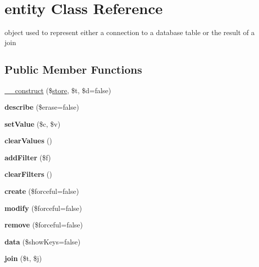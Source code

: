 \hypertarget{classentity}{}\section{entity Class Reference}
\label{classentity}


object used to represent either a connection to a database table or the result of a join  


\subsection*{Public Member Functions}
\begin{DoxyCompactItemize}
\item 
\hyperlink{classentity_a2411a96bf911703bf07e8bac90ffa7f7}{\+\_\+\+\_\+construct} (\$\hyperlink{classstore}{store}, \$t, \$d=false)
\item 
\hypertarget{classentity_a3782e4d51b5f4e688676843e12450a94}{}{\bfseries describe} (\$erase=false)\label{classentity_a3782e4d51b5f4e688676843e12450a94}

\item 
\hypertarget{classentity_a11cae02dda3cc8b9ad4966e33ef11a2a}{}{\bfseries set\+Value} (\$c, \$v)\label{classentity_a11cae02dda3cc8b9ad4966e33ef11a2a}

\item 
\hypertarget{classentity_a7afa5fa5ccc2f9b9a0390cad59ecfede}{}{\bfseries clear\+Values} ()\label{classentity_a7afa5fa5ccc2f9b9a0390cad59ecfede}

\item 
\hypertarget{classentity_a7041812e724f4d4e92f7350ac1ca4730}{}{\bfseries add\+Filter} (\$f)\label{classentity_a7041812e724f4d4e92f7350ac1ca4730}

\item 
\hypertarget{classentity_a3c82e6e7a3a2c79306206db541d2a343}{}{\bfseries clear\+Filters} ()\label{classentity_a3c82e6e7a3a2c79306206db541d2a343}

\item 
\hypertarget{classentity_aa093f16b8fa83dcba92779df20f8a53f}{}{\bfseries create} (\$forceful=false)\label{classentity_aa093f16b8fa83dcba92779df20f8a53f}

\item 
\hypertarget{classentity_a93f973ae16957a93f792003a89a13be0}{}{\bfseries modify} (\$forceful=false)\label{classentity_a93f973ae16957a93f792003a89a13be0}

\item 
\hypertarget{classentity_a67aada7aaf1810524e8ae93992f2900c}{}{\bfseries remove} (\$forceful=false)\label{classentity_a67aada7aaf1810524e8ae93992f2900c}

\item 
\hypertarget{classentity_adfb66dcc511ef54670c2999d9f716eb9}{}{\bfseries data} (\$show\+Keys=false)\label{classentity_adfb66dcc511ef54670c2999d9f716eb9}

\item 
\hypertarget{classentity_a4d4ed92c955fe0e4160ae7572e693be7}{}{\bfseries join} (\$t, \$j)\label{classentity_a4d4ed92c955fe0e4160ae7572e693be7}

\end{DoxyCompactItemize}
